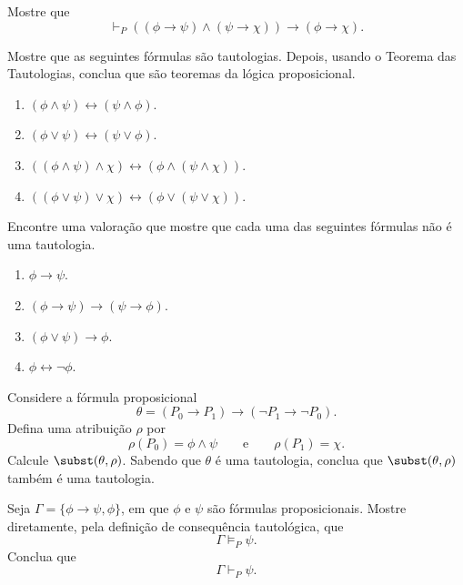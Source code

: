 \begin{exercise}
    Mostre que
    \[
        \vdash_P ((\phi\rightarrow\psi)\land(\psi\rightarrow\chi))\rightarrow(\phi\rightarrow\chi).
    \]
\end{exercise}

\begin{exercise}
    Mostre que as seguintes fórmulas são tautologias.
    Depois, usando o Teorema das Tautologias, conclua que são teoremas da lógica proposicional.
    \begin{enumerate}[label=(\alph*)]
        \item $(\phi\land\psi)\leftrightarrow(\psi\land\phi)$.
        \item $(\phi\lor\psi)\leftrightarrow(\psi\lor\phi)$.
        \item $((\phi\land\psi)\land\chi)\leftrightarrow(\phi\land(\psi\land\chi))$.
        \item $((\phi\lor\psi)\lor\chi)\leftrightarrow(\phi\lor(\psi\lor\chi))$.
    \end{enumerate}
\end{exercise}

\begin{exercise}
    Encontre uma valoração que mostre que cada uma das seguintes fórmulas não é uma tautologia.
    \begin{enumerate}[label=(\alph*)]
        \item $\phi\rightarrow\psi$.
        \item $(\phi\rightarrow\psi)\rightarrow(\psi\rightarrow\phi)$.
        \item $(\phi\lor\psi)\rightarrow\phi$.
        \item $\phi\leftrightarrow\neg\phi$.
    \end{enumerate}
\end{exercise}

\begin{exercise}
    Considere a fórmula proposicional
    \[
        \theta=(P_0\rightarrow P_1)\rightarrow(\neg P_1\rightarrow\neg P_0).
    \]
    Defina uma atribuição $\rho$ por
    \[
        \rho(P_0)=\phi\land\psi
        \qquad\text{e}\qquad
        \rho(P_1)=\chi.
    \]
    Calcule $\subst(\theta,\rho)$.
    Sabendo que $\theta$ é uma tautologia, conclua que $\subst(\theta,\rho)$ também é uma tautologia.
\end{exercise}

\begin{exercise}
    Seja $\Gamma=\{\phi\rightarrow\psi,\phi\}$, em que $\phi$ e $\psi$ são fórmulas proposicionais.
    Mostre diretamente, pela definição de consequência tautológica, que
    \[
        \Gamma\models_P \psi.
    \]
    Conclua que
    \[
        \Gamma\vdash_P \psi.
    \]
\end{exercise}

